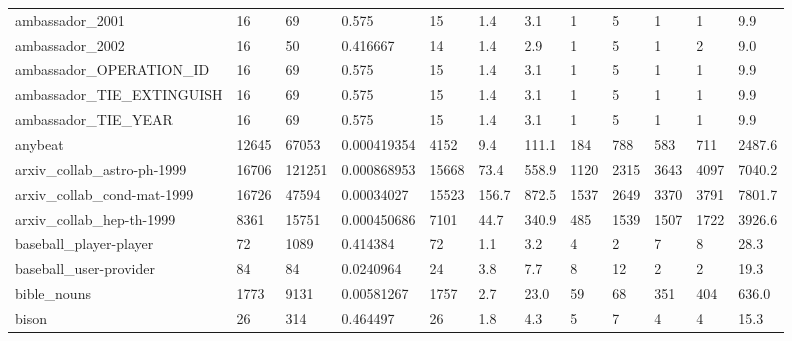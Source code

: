 \begin{longtable}{llllllllllll}
 ambassador\_2001                                    & 16         & 69        & 0.575       & 15    & 1.4    & 3.1    & 1     & 5      & 1      & 1      & 9.9     \\
 ambassador\_2002                                    & 16         & 50        & 0.416667    & 14    & 1.4    & 2.9    & 1     & 5      & 1      & 2      & 9.0     \\
 ambassador\_OPERATION\_ID                            & 16         & 69        & 0.575       & 15    & 1.4    & 3.1    & 1     & 5      & 1      & 1      & 9.9     \\
 ambassador\_TIE\_EXTINGUISH                          & 16         & 69        & 0.575       & 15    & 1.4    & 3.1    & 1     & 5      & 1      & 1      & 9.9     \\
 ambassador\_TIE\_YEAR                                & 16         & 69        & 0.575       & 15    & 1.4    & 3.1    & 1     & 5      & 1      & 1      & 9.9     \\
 anybeat                                            & 12645      & 67053     & 0.000419354 & 4152  & 9.4    & 111.1  & 184   & 788    & 583    & 711    & 2487.6  \\
 arxiv\_collab\_astro-ph-1999                         & 16706      & 121251    & 0.000868953 & 15668 & 73.4   & 558.9  & 1120  & 2315   & 3643   & 4097   & 7040.2  \\
 arxiv\_collab\_cond-mat-1999                         & 16726      & 47594     & 0.00034027  & 15523 & 156.7  & 872.5  & 1537  & 2649   & 3370   & 3791   & 7801.7  \\
 arxiv\_collab\_hep-th-1999                           & 8361       & 15751     & 0.000450686 & 7101  & 44.7   & 340.9  & 485   & 1539   & 1507   & 1722   & 3926.6  \\
 baseball\_player-player                             & 72         & 1089      & 0.414384    & 72    & 1.1    & 3.2    & 4     & 2      & 7      & 8      & 28.3    \\
 baseball\_user-provider                             & 84         & 84        & 0.0240964   & 24    & 3.8    & 7.7    & 8     & 12     & 2      & 2      & 19.3    \\
 bible\_nouns                                        & 1773       & 9131      & 0.00581267  & 1757  & 2.7    & 23.0   & 59    & 68     & 351    & 404    & 636.0   \\
 bison                                              & 26         & 314       & 0.464497    & 26    & 1.8    & 4.3    & 5     & 7      & 4      & 4      & 15.3    \\

\end{longtable}
